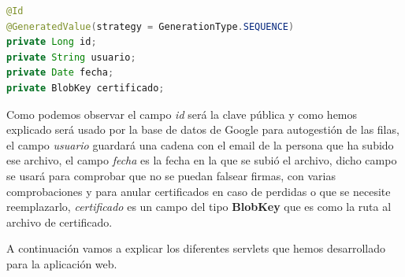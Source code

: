 \begin{description}
\begin{lstlisting}[language=Java]
@Id
@GeneratedValue(strategy = GenerationType.SEQUENCE)
private Long id;
private String usuario;
private Date fecha;
private BlobKey certificado;
\end{lstlisting}

Como podemos observar el campo \textit{id} será la clave pública y como hemos explicado será usado por la base de datos de Google para autogestión de las filas, el campo \textit{usuario} guardará una cadena con el email de la persona que ha subido ese archivo, el campo \textit{fecha} es la fecha en la que se subió el archivo, dicho campo se usará para comprobar que no se puedan falsear firmas, con varias comprobaciones y para anular certificados en caso de perdidas o que se necesite reemplazarlo, \textit{certificado} es un campo del tipo \textbf{BlobKey} que es como la ruta al archivo de certificado.

\end{description}
A continuación vamos a explicar los diferentes servlets que hemos desarrollado para la aplicación web.

